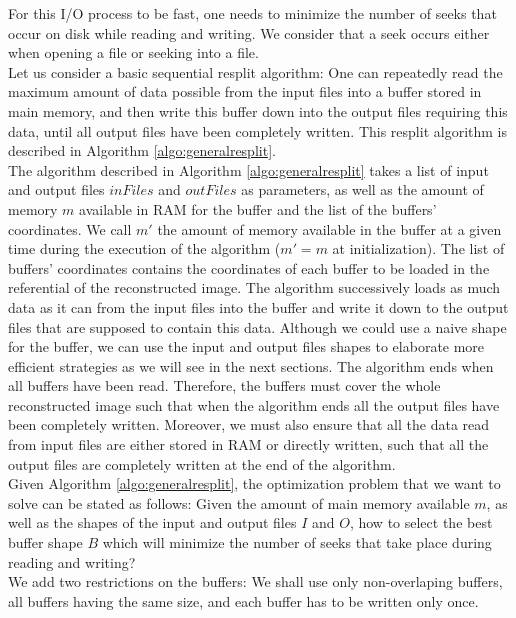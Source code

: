 \documentclass[conference]{IEEEtran}
\begin{document}
For this I/O process to be fast, one needs to minimize the number of seeks that occur on disk while reading and writing.
We consider that a seek occurs either when opening a file or seeking into a file. \\

Let us consider a basic sequential resplit algorithm: One can repeatedly read the maximum amount of data possible from the input files into a buffer stored in main memory, and then write this buffer down into the output files requiring this data, until all output files have been completely written.
This resplit algorithm is described in Algorithm \ref{algo:generalresplit}. \\

The algorithm described in Algorithm \ref{algo:generalresplit} takes a list of input and output files $inFiles$ and $outFiles$ as parameters, as well as the amount of memory $m$ available in RAM for the buffer and the list of the buffers' coordinates. We call $m'$ the amount of memory available in the buffer at a given time during the execution of the algorithm ($m'=m$ at initialization). The list of buffers' coordinates contains the coordinates of each buffer to be loaded in the referential of the reconstructed image.
The algorithm successively loads as much data as it can from the input files into the buffer and write it down to the output files that are supposed to contain this data.
Although we could use a naive shape for the buffer, we can use the input and output files shapes to elaborate more efficient strategies as we will see in the next sections.
The algorithm ends when all buffers have been read.
Therefore, the buffers must cover the whole reconstructed image such that when the algorithm ends all the output files have been completely written.
Moreover, we must also ensure that all the data read from input files are either stored in RAM or directly written, such that all the output files are completely written at the end of the algorithm. \\

Given Algorithm \ref{algo:generalresplit}, the optimization problem that we want to solve can be stated as follows:
Given the amount of main memory available $m$, as well as the shapes of the input and output files $I$ and $O$, how to select the best buffer shape $B$ which will minimize the number of seeks that take place during reading and writing? \\

We add two restrictions on the buffers: We shall use only non-overlaping buffers, all buffers having the same size, and each buffer has to be written only once.
\end{document}
